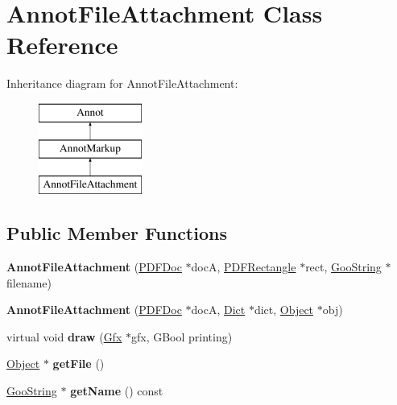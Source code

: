 \hypertarget{class_annot_file_attachment}{}\section{Annot\+File\+Attachment Class Reference}
\label{class_annot_file_attachment}
Inheritance diagram for Annot\+File\+Attachment\+:\begin{figure}[H]
\begin{center}
\leavevmode
\includegraphics[height=3.000000cm]{class_annot_file_attachment}
\end{center}
\end{figure}
\subsection*{Public Member Functions}
\begin{DoxyCompactItemize}
\item 
\mbox{\label{class_annot_file_attachment_a81420ca3d64a6c3aa11843aa4e59b9be}} 
{\bfseries Annot\+File\+Attachment} (\hyperlink{class_p_d_f_doc}{P\+D\+F\+Doc} $\ast$docA, \hyperlink{class_p_d_f_rectangle}{P\+D\+F\+Rectangle} $\ast$rect, \hyperlink{class_goo_string}{Goo\+String} $\ast$filename)
\item 
\mbox{\label{class_annot_file_attachment_adbcddcd7f324e8ba9670fca7ff75c747}} 
{\bfseries Annot\+File\+Attachment} (\hyperlink{class_p_d_f_doc}{P\+D\+F\+Doc} $\ast$docA, \hyperlink{class_dict}{Dict} $\ast$dict, \hyperlink{class_object}{Object} $\ast$obj)
\item 
\mbox{\label{class_annot_file_attachment_aae1bec79d72e368bf94ef81a71e53b51}} 
virtual void {\bfseries draw} (\hyperlink{class_gfx}{Gfx} $\ast$gfx, G\+Bool printing)
\item 
\mbox{\label{class_annot_file_attachment_af802868e67051ae94fe3a7e537c54777}} 
\hyperlink{class_object}{Object} $\ast$ {\bfseries get\+File} ()
\item 
\mbox{\label{class_annot_file_attachment_a46b54cf3bdd25e5f4e73c0b68717a93b}} 
\hyperlink{class_goo_string}{Goo\+String} $\ast$ {\bfseries get\+Name} () const
\end{DoxyCompactItemize}
